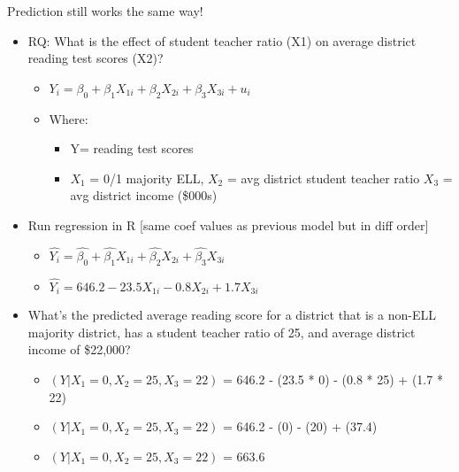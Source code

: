 \documentclass[8pt,ignorenonframetext,dvipsnames]{beamer}
\providecommand{\tightlist}{%
  \setlength{\itemsep}{0pt}\setlength{\parskip}{0pt}}
\let\olditem\item
\renewcommand{\item}{%
  \olditem\vspace{4pt}
}
\begin{document}
\begin{frame}{Prediction still works the same way!}
\protect\hypertarget{prediction-still-works-the-same-way}{}

\begin{itemize}
\tightlist
\item
  RQ: What is the effect of student teacher ratio (X1) on average
  district reading test scores (X2)?

  \begin{itemize}
  \tightlist
  \item
    \(Y_i = \beta_0 + \beta_1X_{1i} + \beta_2X_{2i} + \beta_3X_{3i} + u_i\)
  \item
    Where:

    \begin{itemize}
    \tightlist
    \item
      Y= reading test scores
    \item
      \(X_1\) = 0/1 majority ELL, \(X_2\) = avg district student teacher
      ratio \(X_3\) = avg district income (\$000s)
    \end{itemize}
  \end{itemize}
\item
  Run regression in R {[}same coef values as previous model but in diff
  order{]}

  \begin{itemize}
  \tightlist
  \item
    \(\hat{Y_i} = \hat{\beta_0} + \hat{\beta_1} X_{1i} + \hat{\beta_2} X_{2i} + \hat{\beta_3} X_{3i}\)
  \item
    \(\hat{Y_i} = 646.2 - 23.5 X_{1i} -0.8 X_{2i} + 1.7 X_{3i}\)
  \end{itemize}
\item
  What's the predicted average reading score for a district that is a
  non-ELL majority district, has a student teacher ratio of 25, and
  average district income of \$22,000?

  \begin{itemize}
  \tightlist
  \item
    \((Y| X_1=0, X_2=25, X_3=22)\) = 646.2 - (23.5 * 0) - (0.8 * 25) +
    (1.7 * 22)
  \item
    \((Y| X_1=0, X_2=25, X_3=22)\) = 646.2 - (0) - (20) + (37.4)
  \item
    \((Y| X_1=0, X_2=25, X_3=22)\) = 663.6
  \end{itemize}
\end{itemize}

\end{frame}
\end{document}
